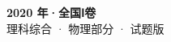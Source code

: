 \documentclass[zihao=-4, a4paper]{ctexart}
\begin{document}
\begin{center}
  {\Large\bfseries 2020 年·全国Ⅰ卷}\\[4pt]
  {\large 理科综合 · 物理部分 · 试题版}
\end{center}
\medskip
{}

\end{document}
